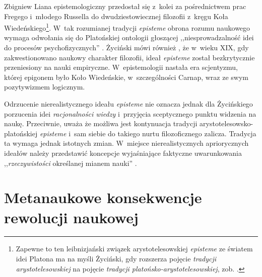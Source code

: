 \begin{artplenv}{Zbigniew Liana}
epistemologiczny przedostał się z~kolei za pośrednictwem prac Fregego i~młodego Russella do dwudziestowiecznej
filozofii z~kręgu Koła Wiedeńskiego\footnote{Zapewne to ten leibnizjański związek arystotelesowskiej \textit{episteme} ze
światem idei Platona ma na myśli Życiński, gdy rozszerza pojęcie \textit{tradycji arystotelesowskiej} na pojęcie
\textit{tradycji platońsko-arystotelesowskiej}, zob.
\parencites[s.~12]{zycinski_structure_1988}[s.~22]{zycinski_struktura_2013}[s.~126]{zycinski_elementy_1996}.
}. W~tak rozumianej tradycji \textit{episteme} obrona rozumu naukowego wymaga odwołania się do Platońskiej
ontologii głoszącej ,,niesprowadzalność idei do procesów psychofizycznych''
\parencite[s.~126]{zycinski_elementy_1996}.
Życiński mówi również
\parencite[s.~102n]{zycinski_jezyk_1983},
że w~wieku XIX, gdy zakwestionowano naukowy
charakter filozofii, ideał \textit{episteme} został bezkrytycznie przeniesiony na nauki empiryczne. W~epistemologii
nastała era scjentyzmu, której epigonem było Koło Wiedeńskie, w~szczególności Carnap, wraz ze swym pozytywizmem
logicznym.

Odrzucenie nierealistycznego ideału \textit{episteme} nie oznacza jednak dla Życińskiego porzucenia idei
\textit{racjonalności wiedzy} i~przyjęcia sceptycznego punktu widzenia na naukę. Przeciwnie, uważa że możliwa jest
kontynuacja tradycji arystotelesowsko-platońskiej \textit{episteme} i~sam siebie do takiego nurtu filozoficznego zalicza.
Tradycja ta wymaga jednak istotnych zmian. W~miejsce nierealistycznych apriorycznych ideałów należy przedstawić
koncepcje wyjaśniające faktyczne uwarunkowania ,,\textit{rzeczywistości} określanej mianem nauki''
\parencite[zob.][s.~126 -- podkreślenie moje]{zycinski_elementy_1996}.

\section{Metanaukowe konsekwencje rewolucji naukowej}\label{lia-sec-4}


\end{artplenv}
